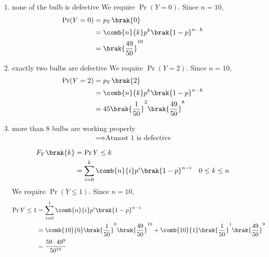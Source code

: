 \documentclass[journal,12pt,onecolumn]{IEEEtran}
\theoremstyle{remark}
\begin{document}
\begin{enumerate}
\item none of the bulb is defective
     We require $\Pr(Y = 0)$. Since $n = 10$,
             \begin{align}
                \Pr(Y = 0) &=  p_Y\brak{0} \\
                           &= \comb{n}{k}p^k\brak{1-p}^{n-k} \\
                           &= \brak{\frac{49}{50}}^{10}
             \end{align} 
\item exactly two bulbs are defective
We require $\Pr(Y = 2)$. Since $n = 10$,
             \begin{align}
                \Pr(Y = 2) &=  p_Y\brak{2} \\
                           &= \comb{n}{k}p^k\brak{1-p}^{n-k} \\
                           &= 45 \brak{\frac{1}{50}}^{2}\brak{\frac{49}{50}}^{8}
             \end{align} 
\item more than 8 bulbs are working properly
\begin{align}
\implies \text{Atmost 1 is defective}
\end{align}

\begin{align}
    F_Y\brak{k} &= \Pr{Y \le k} \\
                    &=\sum_{i=0}^{k}\comb{n}{i}p^i\brak{1-p}^{n-i} & 0 \le k \le n \\
    \end{align}
    We require $\Pr({Y\le1})$. Since $n = 10$,
             \begin{align}
                      \Pr{Y\le1}&= \sum_{i=0}^{1}\comb{n}{i}p^i\brak{1-p}^{n-i} \\
                                &= \comb{10}{0}\brak{\frac{1}{50}}^{0}\brak{\frac{49}{50}}^{10} + \comb{10}{1}\brak{\frac{1}{50}}^{1}\brak{\frac{49}{50}}^{9}\\
                                &= \frac{59 \cdot {49^9}}{50^{10}}
            \end{align}
            \end{enumerate}
\end{document}
